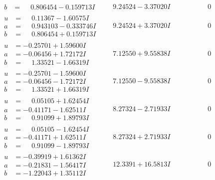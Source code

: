 \documentclass[1p]{elsarticle_modified}
\theoremstyle{definition}
\begin{document}
$$\begin{array}{c|c|c}
\begin{aligned}
b &= \phantom{-}0.806454 - 0.159713 I\end{aligned}
 & \phantom{-}9.24524 - 3.37020 I & \phantom{-0.000000 } 0 \\ \hline\begin{aligned}
u &= \phantom{-}0.11367 - 1.60575 I \\
a &= \phantom{-}0.943103 - 0.333746 I \\
b &= \phantom{-}0.806454 + 0.159713 I\end{aligned}
 & \phantom{-}9.24524 + 3.37020 I & \phantom{-0.000000 } 0 \\ \hline\begin{aligned}
u &= -0.25701 + 1.59600 I \\
a &= -0.06456 + 1.72172 I \\
b &= \phantom{-}1.33521 - 1.66319 I\end{aligned}
 & \phantom{-}7.12550 + 9.55838 I & \phantom{-0.000000 } 0 \\ \hline\begin{aligned}
u &= -0.25701 - 1.59600 I \\
a &= -0.06456 - 1.72172 I \\
b &= \phantom{-}1.33521 + 1.66319 I\end{aligned}
 & \phantom{-}7.12550 - 9.55838 I & \phantom{-0.000000 } 0 \\ \hline\begin{aligned}
u &= \phantom{-}0.05105 + 1.62454 I \\
a &= -0.41171 - 1.62511 I \\
b &= \phantom{-}0.91099 + 1.89793 I\end{aligned}
 & \phantom{-}8.27324 - 2.71933 I & \phantom{-0.000000 } 0 \\ \hline\begin{aligned}
u &= \phantom{-}0.05105 - 1.62454 I \\
a &= -0.41171 + 1.62511 I \\
b &= \phantom{-}0.91099 - 1.89793 I\end{aligned}
 & \phantom{-}8.27324 + 2.71933 I & \phantom{-0.000000 } 0 \\ \hline\begin{aligned}
u &= -0.39919 + 1.61362 I \\
a &= -0.21831 - 1.56417 I \\
b &= -1.22043 + 1.35112 I\end{aligned}
 & \phantom{-}12.3391 + 16.5813 I & \phantom{-0.000000 } 0 \\ \hline\begin{aligned}

\end{aligned}
\end{array}$$
\end{document}
